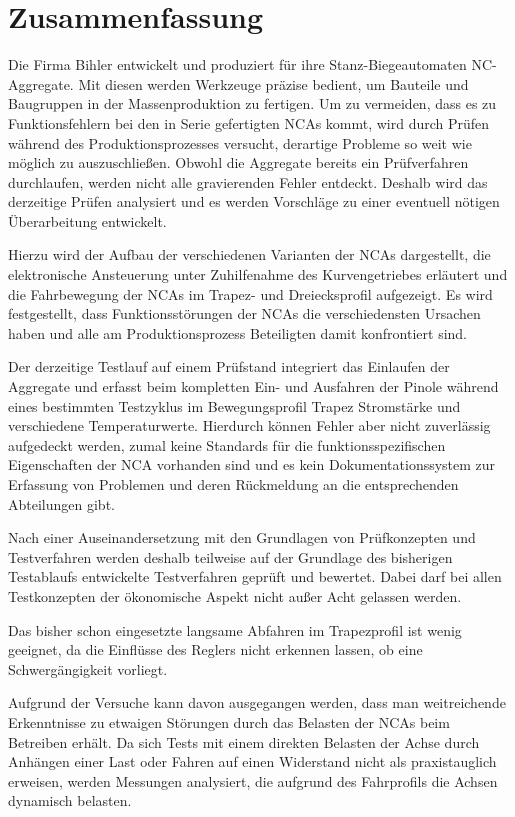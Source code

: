 \chapter*{Zusammenfassung}


Die Firma Bihler entwickelt und produziert für ihre Stanz-Biegeautomaten NC-Aggregate. Mit diesen werden Werkzeuge präzise bedient, um Bauteile und Baugruppen in der Massenproduktion zu fertigen. Um zu vermeiden, dass es zu Funktionsfehlern bei den in Serie gefertigten NCAs kommt, wird durch Prüfen während des Produktionsprozesses versucht, derartige Probleme so weit wie möglich zu auszuschließen. Obwohl die Aggregate bereits ein Prüfverfahren durchlaufen, werden nicht alle gravierenden Fehler entdeckt. Deshalb wird das derzeitige Prüfen analysiert und es werden Vorschläge zu einer eventuell nötigen Überarbeitung entwickelt.


Hierzu wird der Aufbau der verschiedenen Varianten der NCAs dargestellt, die elektronische Ansteuerung unter Zuhilfenahme des Kurvengetriebes erläutert und die Fahrbewegung der NCAs im Trapez- und Dreiecksprofil aufgezeigt. Es wird festgestellt, dass Funktionsstörungen der NCAs die verschiedensten Ursachen haben und alle am Produktionsprozess Beteiligten damit konfrontiert sind.

Der derzeitige Testlauf auf einem Prüfstand integriert das Einlaufen der Aggregate und erfasst beim kompletten Ein- und Ausfahren der Pinole während eines bestimmten Testzyklus im Bewegungsprofil Trapez Stromstärke und verschiedene Temperaturwerte. Hierdurch können Fehler aber nicht zuverlässig aufgedeckt werden, zumal keine Standards für die funktionsspezifischen Eigenschaften der NCA vorhanden sind und es kein Dokumentationssystem zur Erfassung von Problemen und deren Rückmeldung an die entsprechenden Abteilungen gibt.


Nach einer Auseinandersetzung mit den Grundlagen von Prüfkonzepten und Testverfahren werden deshalb teilweise auf der Grundlage des bisherigen Testablaufs entwickelte Testverfahren geprüft und bewertet. Dabei darf bei allen Testkonzepten der ökonomische Aspekt nicht außer Acht gelassen werden.

Das bisher schon eingesetzte langsame Abfahren im Trapezprofil ist wenig geeignet, da die Einflüsse des Reglers nicht erkennen lassen, ob eine Schwergängigkeit vorliegt. 

Aufgrund der Versuche kann davon ausgegangen werden, dass man weitreichende Erkenntnisse zu etwaigen Störungen durch das Belasten der NCAs beim Betreiben erhält. Da sich Tests mit einem direkten Belasten der Achse durch Anhängen einer Last oder Fahren auf einen Widerstand nicht als praxistauglich erweisen, werden Messungen analysiert, die aufgrund des Fahrprofils die Achsen dynamisch belasten. 

